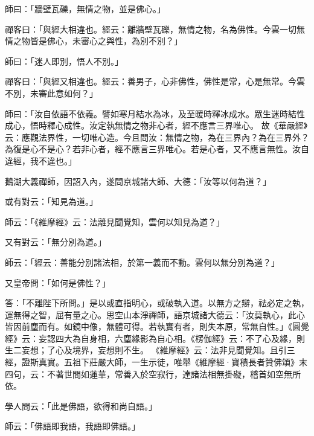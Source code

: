 師曰：「牆壁瓦礫，無情之物，並是佛心。」

禪客曰：「與經大相違也。經云：{\kaishu 離牆壁瓦礫，無情之物，名為佛性。}今雲一切無情之物皆是佛心，未審心之與性，為別不別？」

師曰：「迷人即別，悟人不別。」

禪客曰：「與經又相違也。經云：{\kaishu 善男子，心非佛性，佛性是常，心是無常}。今雲不別，未審此意如何？」

師曰：「汝自依語不依義。譬如寒月結水為冰，及至暖時釋冰成水。眾生迷時結性成心，悟時釋心成性。汝定執無情之物非心者，經不應言三界唯心。
故《華嚴經》云：{\kaishu 應觀法界性，一切唯心造。}今且問汝：無情之物，為在三界內？為在三界外？為復是心不是心？若非心者，經不應言三界唯心。若是心者，又不應言無性。汝自違經，我不違也。」

鵝湖大義禪師，因詔入內，遂問京城諸大師、大德：「汝等以何為道？」

或有對云：「知見為道。」

師云：「《維摩經》云：法離見聞覺知，雲何以知見為道？」

又有對云：「無分別為道。」

師云：「經云：善能分別諸法相，於第一義而不動。雲何以無分別為道？」

又皇帝問：「如何是佛性？」

答：「不離陛下所問。」是以或直指明心，或破執入道。以無方之辯，祛必定之執，運無得之智，屈有量之心。思空山本淨禪師，語京城諸大德云：「汝莫執心，此心皆因前塵而有。如鏡中像，無體可得。若執實有者，則失本原，常無自性。」《圓覺經》云：{\kaishu 妄認四大為自身相，六塵緣影為自心相}。《楞伽經》云：{\kaishu 不了心及緣，則生二妄想；了心及境界，妄想則不生}。
《維摩經》云：{\kaishu 法非見聞覺知}。且引三經，證斯真實。五祖下莊嚴大師，一生示徒，唯舉《維摩經·寶積長者贊佛頌》末四句，云：{\kaishu 不著世間如蓮華，常善入於空寂行，達諸法相無掛礙，稽首如空無所依}。

學人問云：「此是佛語，欲得和尚自語。」

師云：「佛語即我語，我語即佛語。」

